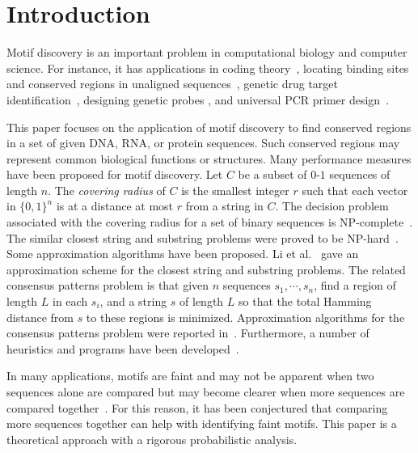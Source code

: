 \documentclass[11pt]{article}
\begin{document}
\newpage

\section{Introduction}
Motif discovery is an important problem in computational biology and
computer science. For instance, it has applications in coding
theory~\cite{FrancesLitman97,GasieniecJanssonLingas99}, locating
binding sites and conserved regions in unaligned
sequences~\cite{StormoHartzell91,LawrenceReilly90,HertzStormo94,Stormo90},
genetic drug target identification~\cite{LanctotLiMaWangZhang99},
designing genetic probes \cite{LanctotLiMaWangZhang99}, and
universal PCR primer
design~\cite{LucasBusch91,DopazoSobrino93,ProutskiHolme96,LanctotLiMaWangZhang99}.


This paper focuses on the application of motif discovery to find
conserved regions in a set of given DNA, RNA, or protein sequences.
Such conserved regions may represent common biological functions or
structures. Many performance measures have been proposed for motif
discovery. Let $C$ be a subset of $0$-$1$ sequences of length $n$.
The {\it covering radius} of $C$ is the smallest integer $r$ such
that each vector in $\{0, 1\}^n$ is at a distance at most $r$ from a
string in $C$. The decision problem associated with the covering
radius for a set of binary sequences is
NP-complete~\cite{FrancesLitman97}. The similar closest string and
substring problems were proved to be
NP-hard~\cite{FrancesLitman97,LanctotLiMaWangZhang99}.
Some approximation algorithms have been proposed.
  Li et
al.~\cite{LiMaWang99} gave an approximation scheme for the closest
string and substring problems. The related consensus patterns
problem is that given $n$ sequences $s_1,\cdots, s_n$, find a region
of length $L$ in each $s_i$, and a string $s$ of length $L$ so that
the total Hamming distance from $s$ to these regions is minimized.
Approximation algorithms for the consensus patterns problem were
reported in~\cite{LiMaWang99b}. Furthermore, a number  of heuristics
and programs have been
developed~\cite{PevznerSze00,KeichPevzner02,KeichPevzner02b,WangDong05,ChinLeung05}.



In many applications,  motifs are faint and may not be apparent when
two sequences alone are compared but may become clearer when  more
sequences are compared together~\cite{Gusfield97}.
For this reason, it has been conjectured that comparing more
sequences together can help with identifying faint motifs.
This paper is a theoretical approach with a rigorous probabilistic
analysis.
\end{document}
